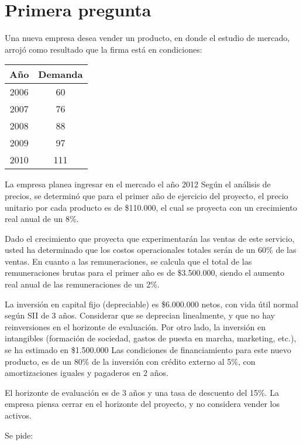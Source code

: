 \section{Primera pregunta}

Una nueva empresa desea vender un producto, en donde el estudio de mercado,
arrojó como resultado que la firma está en condiciones:

\begin{center}
    \begin{tabular}{|c|c|}
        \hline
        Año   &  Demanda\\\hline
        2006  &  60\\
        2007  &  76\\
        2008  &  88\\
        2009  &  97\\
        2010  &  111\\\hline
    \end{tabular}
\end{center}

La empresa planea ingresar en el mercado el año 2012 Según el análisis de precios,
se determinó que para el primer año de ejercicio del proyecto, el precio unitario
por cada producto es de \$110.000, el cual se proyecta con un crecimiento real anual de un 8\%.

Dado el crecimiento que proyecta que experimentarán las ventas de este servicio,
usted ha determinado que los costos operacionales totales serán de un 60\% de las ventas.
En cuanto a las remuneraciones, se calcula que el total de las remuneraciones brutas para
el primer año es de \$3.500.000, siendo el aumento real anual de las remuneraciones de un 2\%. 


La inversión en capital fijo (depreciable) es \$6.000.000 netos, con vida útil normal según SII de 3 años.
Considerar que se deprecian linealmente, y que no hay reinversiones en el horizonte de evaluación.
Por otro lado, la inversión en intangibles (formación de sociedad, gastos de puesta en marcha, marketing, etc.),
se ha estimado en \$1.500.000 
Las condiciones de financiamiento para este nuevo producto,
es de un 80\% de la inversión con crédito externo al 5\%, con amortizaciones iguales y pagaderos en 2 años. 

El horizonte de evaluación es de 3 años y una tasa de descuento del 15\%.
La empresa piensa cerrar en el horizonte del proyecto, y no considera vender los activos.

Se pide:


